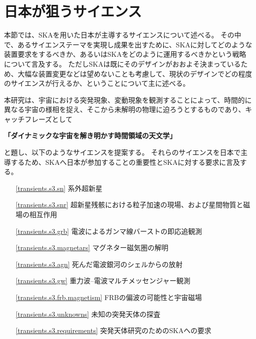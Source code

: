 \section{日本が狙うサイエンス}\label{transients.s3}

本節では、SKAを用いた日本が主導するサイエンスについて述べる。
その中で、あるサイエンステーマを実現し成果を出すために、SKAに対してどのような装置要求をするべきか、あるいはSKAをどのように運用するべきかという戦略について言及する。
ただしSKAは既にそのデザインがおおよそ決まっているため、大幅な装置変更などは望めないことも考慮して、現状のデザインでどの程度のサイエンスが行えるか、ということについて主に述べる。

本研究は、宇宙における突発現象、変動現象を観測することによって、時間的に異なる宇宙の様相を捉え、そこから未解明の物理に迫ろうとするものであり、キャッチフレーズとして
\begin{center}
{\large \bf 「ダイナミックな宇宙を解き明かす時間領域の天文学」}
\end{center}
と題し、以下のようなサイエンスを提案する。
それらのサイエンスを日本で主導するため、SKAへ日本が参加することの重要性とSKAに対する要求に言及する。
\begin{itemize}
	\setlength{\leftskip}{3zw}
	\item [\ref{transients.s3.sn}] 系外超新星
	\item [\ref{transients.s3.snr}] 超新星残骸における粒子加速の現場、および星間物質と磁場の相互作用
	\item [\ref{transients.s3.grb}] 電波によるガンマ線バーストの即応追観測
	\item [\ref{transients.s3.magnetars}] マグネター磁気圏の解明
	\item [\ref{transients.s3.agn}] 死んだ電波銀河のシェルからの放射
	\item [\ref{transients.s3.gw}] 重力波--電波マルチメッセンジャー観測
	\item [\ref{transients.s3.frb.magnetism}] FRBの偏波の可能性と宇宙磁場	
	\item [\ref{transients.s3.unknowns}] 未知の突発天体の探査
	\item [\ref{transients.s3.requirements}] 突発天体研究のためのSKAへの要求
\end{itemize}











